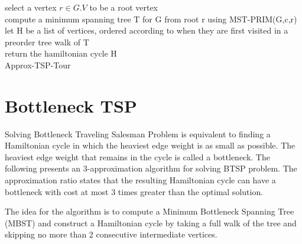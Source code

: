 \documentclass[runningheads, a4paper]{llncs}
\begin{document}
        
\begin{algorithm}[H]
    select a vertex $r \in G.V$ to be a root vertex \\
    
    compute a minimum spanning tree T for G from root r using MST-PRIM(G,c,r) \\
    
    let H be a list of vertices, ordered according to when they are first visited in a preorder tree walk of T \\
    
    return the hamiltonian cycle H \\
    
    
    
    \caption{Approx-TSP-Tour}
    \label{algo:hc_improved}
\end{algorithm}
        
        
\section{Bottleneck TSP}

Solving Bottleneck Traveling Salesman Problem is equivalent to finding a Hamiltonian cycle in which the heaviest edge weight is as small as possible. The heaviest edge weight that remains in the cycle is called a bottleneck. The following presents an 3-approximation algorithm for solving BTSP problem. The approximation ratio states that the resulting Hamiltonian cycle can have a bottleneck with cost at most 3 times greater than the optimal solution.

The idea for the algorithm is to compute a Minimum Bottleneck Spanning Tree (MBST) and construct a Hamiltonian cycle by taking a full walk of the tree and skipping no more than 2 consecutive intermediate vertices.
\end{document}
